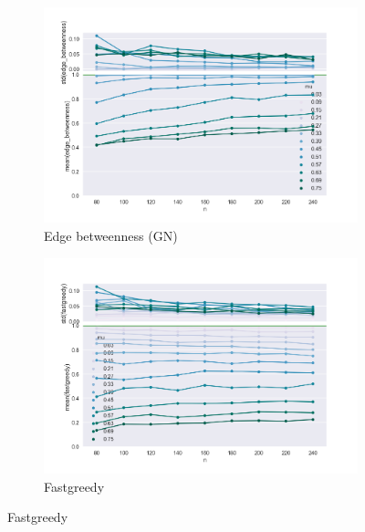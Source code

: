 \begin{figure}
\centering
    \begin{subfigure}[b]{0.32\textwidth}
        \includegraphics[width=\textwidth]{fig/nmi_vs_n_edge_betweenness}
        \caption{Edge betweenness (GN)}
        \label{fig:gull}
    \end{subfigure}
    \qquad
    \begin{subfigure}[b]{0.32\textwidth}
        \includegraphics[width=\textwidth]{fig/nmi_vs_n_fastgreedy}
        \caption{Fastgreedy}
        \label{fig:tiger}
    \end{subfigure}
    

\end{figure}
